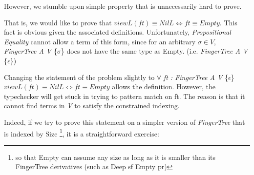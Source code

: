 \documentclass[12pt,twoside,notitlepage]{report}
\newcommand{\Conid}[1]{\mathit{#1}}
\newcommand{\Varid}[1]{\mathit{#1}}
\def\resethooks{%
  \global\let\SaveRestoreHook\empty
  \global\let\ColumnHook\empty}
\newcommand{\hsindent}[1]{\quad}%
\let\hspre\empty
\let\hspost\empty
\begin{document}

However, we stumble upon simple property that is unnecessarily hard to prove.

That is, we would like to prove that $viewL(ft)\equiv NilL \iff ft \equiv Empty$. This fact is obvious given the associated definitions. Unfortunately, \textit{Propositional Equality} cannot allow a term of this form, since for an arbitrary $\sigma \in V$, \textit{FingerTree A V} \{$\sigma$\} does not have the same type as Empty. (i.e. \textit{FingerTree A V} \{$\epsilon$\})

Changing the statement of the problem slightly to $\forall$ \textit{ft : FingerTree A V} \{$\epsilon$\} $viewL(ft) \equiv NilL \iff ft \equiv Empty$ allows the definition. However, the typechecker will get stuck in trying to pattern match on ft. The reason is that it cannot find terms in \textit{V} to satisfy the constrained indexing.

Indeed, if we try to prove this statement on a simpler version of \textit{FingerTree} that is indexed by Size \footnote{so that Empty can assume any size as long as it is smaller than its FingerTree derivatives (such as Deep sf Empty pr)}, it is a straightforward exercise: 
\end{document}
